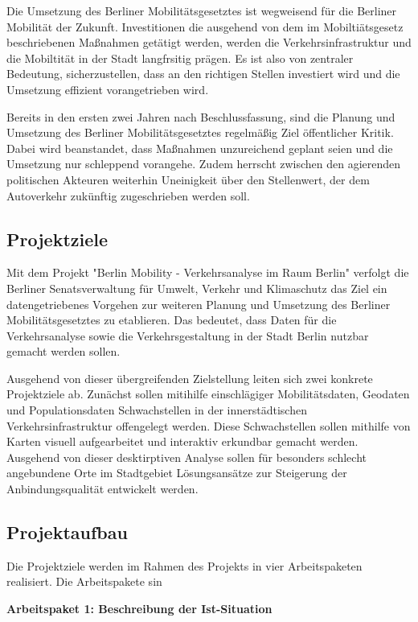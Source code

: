 Die Umsetzung des Berliner Mobilitätsgesetztes ist wegweisend für die Berliner Mobilität der Zukunft. Investitionen die ausgehend von dem im Mobiltiätsgesetz beschriebenen Maßnahmen getätigt werden, werden die Verkehrsinfrastruktur und die Mobiltität in der Stadt langfrsitig prägen. Es ist also von zentraler Bedeutung, sicherzustellen, dass an den richtigen Stellen investiert wird und die Umsetzung effizient vorangetrieben wird. 

Bereits in den ersten zwei Jahren nach Beschlussfassung, sind die Planung und Umsetzung des Berliner Mobilitätsgesetztes regelmäßig Ziel öffentlicher Kritik. Dabei wird beanstandet, dass Maßnahmen unzureichend geplant seien und die Umsetzung nur schleppend vorangehe.  Zudem herrscht zwischen den agierenden politischen Akteuren weiterhin Uneinigkeit über den Stellenwert, der dem Autoverkehr zukünftig zugeschrieben werden soll.

\subsection{Projektziele}
Mit dem Projekt "Berlin Mobility - Verkehrsanalyse im Raum Berlin" verfolgt die Berliner Senatsverwaltung für Umwelt, Verkehr und Klimaschutz das Ziel ein datengetriebenes Vorgehen zur weiteren Planung und Umsetzung des Berliner Mobilitätsgesetztes zu etablieren. Das bedeutet, dass Daten für die Verkehrsanalyse sowie die Verkehrsgestaltung in der Stadt Berlin nutzbar gemacht werden sollen. 

Ausgehend von dieser übergreifenden Zielstellung leiten sich zwei konkrete Projektziele ab. Zunächst sollen mitihilfe einschlägiger Mobilitätsdaten, Geodaten und Populationsdaten Schwachstellen in der innerstädtischen Verkehrsinfrastruktur offengelegt werden. Diese Schwachstellen sollen mithilfe von Karten visuell aufgearbeitet und interaktiv erkundbar gemacht werden. Ausgehend von dieser desktirptiven Analyse sollen für besonders schlecht angebundene Orte im Stadtgebiet Lösungsansätze zur Steigerung der Anbindungsqualität entwickelt werden. 

\subsection{Projektaufbau}
Die Projektziele werden im Rahmen des Projekts in vier Arbeitspaketen realisiert. Die Arbeitspakete sin

\textbf{Arbeitspaket 1: Beschreibung der Ist-Situation}

